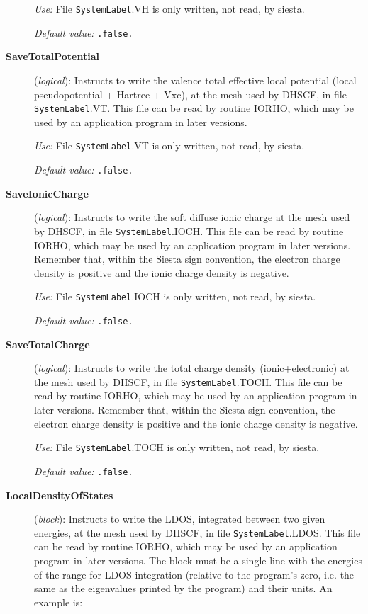 \documentclass[11pt]{article}
\begin{document}
\begin{description}
{\it Use:} File {\tt SystemLabel}.VH is only written, not read, by siesta.

{\it Default value:} {\tt .false.}
        

\item[{\bf SaveTotalPotential}] ({\it logical}): 
Instructs to write the valence total effective local potential
(local pseudopotential + Hartree + Vxc), at the
mesh used by DHSCF,
in file {\tt SystemLabel}.VT. This file can be read by routine IORHO,
which may be used by an application program in later versions.

{\it Use:} File {\tt SystemLabel}.VT is only written, not read, by siesta.

{\it Default value:} {\tt .false.}
        

\item[{\bf SaveIonicCharge}] ({\it logical}): 
Instructs to write the soft diffuse ionic charge at the
mesh used by DHSCF,
in file {\tt SystemLabel}.IOCH. This file can be read by routine IORHO,
which may be used by an application program in later versions.
Remember that, within the {\sc Siesta} sign convention, the electron charge
density is positive and the ionic charge density is negative. 


{\it Use:} File {\tt SystemLabel}.IOCH is only written, not read, by siesta.

{\it Default value:} {\tt .false.}
        
\item[{\bf SaveTotalCharge}] ({\it logical}): 
Instructs to write the total charge density (ionic+electronic) at the
mesh used by DHSCF,
in file {\tt SystemLabel}.TOCH. This file can be read by routine IORHO,
which may be used by an application program in later versions.
Remember that, within the {\sc Siesta} sign convention, the electron charge
density is positive and the ionic charge density is negative. 

{\it Use:} File {\tt SystemLabel}.TOCH is only written, not read, by siesta.

{\it Default value:} {\tt .false.}
        

\item[{\bf LocalDensityOfStates}] ({\it block}): 
Instructs to write the LDOS, integrated between two given energies,
at the mesh used by DHSCF,
in file {\tt SystemLabel}.LDOS. This file can be read by routine IORHO,
which may be used by an application program in later versions.
The block must be a single line with the energies of the range for 
LDOS integration
(relative to the program's zero, i.e. the same as the eigenvalues
printed by the program) and their units.
An example is:


\end{description}
\end{document}
